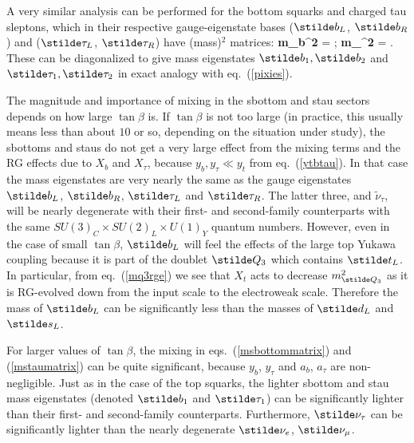 A very similar analysis can be performed for the bottom squarks and
charged tau
sleptons, which in their respective gauge-eigenstate bases
($\stilde b_L$, $\stilde b_R$) and ($\stilde \tau_L$, $\stilde
\tau_R$) have (mass)$^2$ matrices:
\beq
{\bf m_{\stilde b}^2} =
\label{msbottommatrix}
;
\eeq
\beq
{\bf m_{\stilde \tau}^2} =
.
\label{mstaumatrix}
\eeq
These can be diagonalized to give mass eigenstates $\stilde b_1, \stilde
b_2$ and $\stilde \tau_1, \stilde \tau_2$ in exact analogy with
eq.~(\ref{pixies}).

The magnitude and importance of mixing in the sbottom and stau sectors
depends
on how large $\tan\beta$ is.
If $\tan\beta$ is not too large
(in practice, this usually
means less than about $10$ or so,
depending on the situation under study), the sbottoms and staus
do not get a very large effect from the mixing terms and the
RG effects due to $X_b$ and $X_\tau$, because
$y_b,y_\tau \ll y_t$ from
eq.~(\ref{ytbtau}).
In that case the mass eigenstates are very nearly the same as
the gauge eigenstates $\stilde b_L$, $\stilde b_R$, $\stilde \tau_L$
and $\stilde \tau_R$. The latter three, and $\tilde \nu_\tau$,
will be nearly degenerate with
their first- and second-family counterparts with the same
$SU(3)_C \times SU(2)_L \times U(1)_Y$ quantum numbers.
However, even in the case of small $\tan\beta$,
$\stilde b_L$ will feel the effects of the large top Yukawa coupling
because it is part of the doublet $\stilde Q_3$ which contains
$\stilde
t_L$.
In particular, from eq.~(\ref{mq3rge}) we see that $X_t$ acts to decrease
$m_{\stilde Q_3}^2$ as it is RG-evolved down from the input scale
to the electroweak scale.
Therefore the mass of ${\stilde b_L}$ can be significantly
less than the masses of $\stilde d_L$
and $\stilde s_L$.

For larger values of $\tan\beta$, the mixing in
eqs.~(\ref{msbottommatrix}) and (\ref{mstaumatrix}) can be quite
significant, because $y_b$, $y_\tau$ and $a_b$, $a_\tau$
are non-negligible.
Just as in the case of the top squarks, the
lighter sbottom and stau mass eigenstates (denoted $\stilde b_1$ and
$\stilde \tau_1$)
can be significantly lighter than their first- and second-family
counterparts. Furthermore, ${\stilde \nu_\tau}$ can be significantly 
lighter than
the nearly degenerate ${\stilde \nu_e}$, $\stilde \nu_\mu$.

